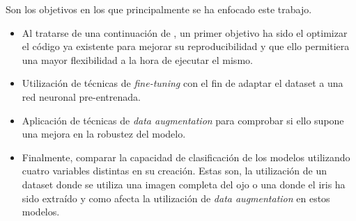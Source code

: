 \label{capitulo2}

Son los objetivos en los que principalmente se ha enfocado este trabajo.

\begin{itemize}
    \item Al tratarse de una continuación de \cite{tfg_iris_2020}, un primer objetivo ha sido el optimizar el código ya existente para 
    mejorar su reproducibilidad y que ello permitiera una mayor flexibilidad a la hora de ejecutar el mismo.
    \item Utilización de técnicas de \textit{fine-tuning} con el fin de adaptar el dataset a una red neuronal pre-entrenada.
    \item Aplicación de técnicas de \textit{data augmentation} para comprobar si ello supone una mejora en la robustez del modelo.
    \item Finalmente, comparar la capacidad de clasificación de los modelos utilizando cuatro variables distintas en su creación. Estas son, la utilización de un dataset donde se utiliza una imagen completa del ojo o una donde el iris ha sido extraído y como afecta la utilización de \textit{data augmentation} en estos modelos.                                                                                                                                                                                                           
\end{itemize}